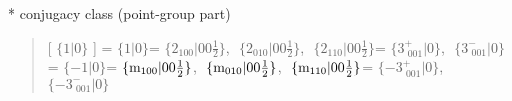 \documentclass[fleqn,10pt,landscape]{jsarticle}
\begin{document}
* conjugacy class (point-group part)
\begin{quote}
[ $\{1|0\}$ ] = \quad $\{1|0\}$\newline[ $\{2{}_{100}|0 0 \frac{1}{2}\}$ ] = \quad $\{2{}_{100}|0 0 \frac{1}{2}\}$,\,\, $\{2{}_{010}|0 0 \frac{1}{2}\}$,\,\, $\{2{}_{110}|0 0 \frac{1}{2}\}$\newline[ $\{3^{+}_{\,\,001}|0\}$ ] = \quad $\{3^{+}_{\,\,001}|0\}$,\,\, $\{3^{-}_{\,\,001}|0\}$\newline[ $\{-1|0\}$ ] = \quad $\{-1|0\}$\newline[ $\{{\rm m}_{100}|0 0 \frac{1}{2}\}$ ] = \quad $\{{\rm m}_{100}|0 0 \frac{1}{2}\}$,\,\, $\{{\rm m}_{010}|0 0 \frac{1}{2}\}$,\,\, $\{{\rm m}_{110}|0 0 \frac{1}{2}\}$\newline[ $\{-3^{+}_{\,\,001}|0\}$ ] = \quad $\{-3^{+}_{\,\,001}|0\}$,\,\, $\{-3^{-}_{\,\,001}|0\}$\newline
\end{quote}
\end{document}
